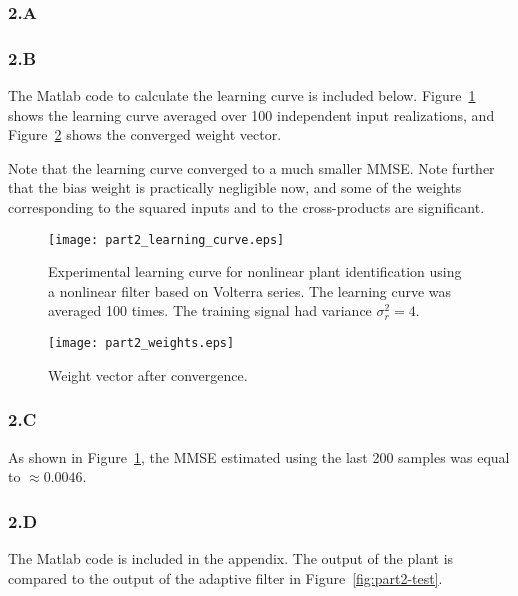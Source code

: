 \pagebreak

\subsubsection*{2.A}


\subsubsection*{2.B}
The Matlab code to calculate the learning curve is included below. Figure~\ref{fig:part2-learning-curve} shows the learning curve averaged over 100 independent input realizations, and  Figure~\ref{fig:part2-weights} shows the converged weight vector. 

Note that the learning curve converged to a much smaller MMSE. Note further that the bias weight is practically negligible now, and some of the weights corresponding to the squared inputs and to the cross-products are significant. 

\FloatBarrier
\begin{figure}[h!]
	\centering
	\texttt{[image: part2\_learning\_curve.eps]}
	\caption{Experimental learning curve for nonlinear plant identification using a nonlinear filter based on Volterra series. The learning curve was averaged 100 times. The training signal had variance $\sigma_r^2 = 4$.}
	\label{fig:part2-learning-curve}
\end{figure}
\FloatBarrier

\FloatBarrier
\begin{figure}[h!]
	\centering
	\texttt{[image: part2\_weights.eps]}
	\caption{Weight vector after convergence.}
	\label{fig:part2-weights}
\end{figure}
\FloatBarrier

\subsubsection*{2.C}

As shown in Figure~\ref{fig:part2-learning-curve}, the MMSE estimated using the last 200 samples was equal to $\approx 0.0046$.

\subsubsection*{2.D}
The Matlab code is included in the appendix. The output of the plant is compared to the output of the adaptive filter in Figure~\ref{fig:part2-test}. 

